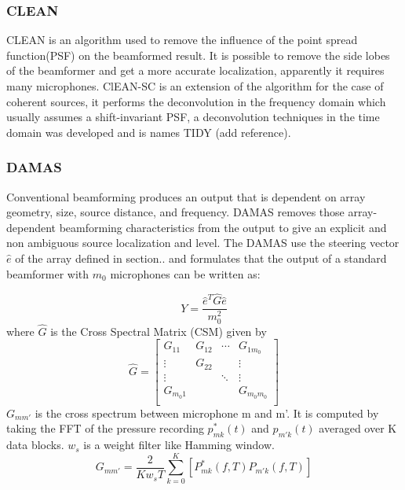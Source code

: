 \subsubsection{CLEAN}

CLEAN is an algorithm used to remove the influence of the point spread function(PSF) on the beamformed result. It is possible to remove the side lobes of the beamformer and get a more accurate localization, apparently it requires many microphones. ClEAN-SC is an extension of the algorithm for the case of coherent sources, it performs the deconvolution in the frequency domain which usually assumes a shift-invariant PSF, a deconvolution techniques in the time domain was developed and is names TIDY (add reference).

\subsubsection{DAMAS}

Conventional beamforming produces an output that is dependent on array geometry, size, source distance, and frequency. DAMAS removes those array-dependent beamforming characteristics from the output to give an explicit and non ambiguous source localization and level. The DAMAS use the steering vector $\hat{e}$ of the array defined in section.. and formulates that the output of a standard beamformer with $m_{0}$ microphones can be written as:

\begin{equation}
    Y=\frac{\hat{e}^{T}\hat{G}\hat{e}}{m_0^2}
    \label{eq:DAMASoutputbeamformer}
\end{equation}
where $\hat{G}$ is the Cross Spectral Matrix (CSM) given by
\begin{equation}
\hat{G}=
    \begin{bmatrix} 
      G_{11} & G_{12} & \cdots & G_{1m_{0}}\\
      \vdots &  G_{22} &       &  \vdots\\
      \vdots &         & \ddots &  \vdots\\
      G_{m_{0}1} &     &       &  G_{m_{0}m_{0}}\\
    \end{bmatrix}  
\end{equation}
$G_{mm'}$ is the cross spectrum between microphone m  and m'. It is computed by taking the FFT of the pressure recording $p^{*}_{mk}(t)$ and $p_{m'k}(t)$ averaged over K data blocks. $w_{s}$ is a weight filter like Hamming window.
\begin{equation}
    G_{mm'}=\frac{2}{Kw_{s}T}\sum\limits_{k=0}^{K}[P^{*}_{mk}(f,T)P_{m'k}(f,T)]
\end{equation}

